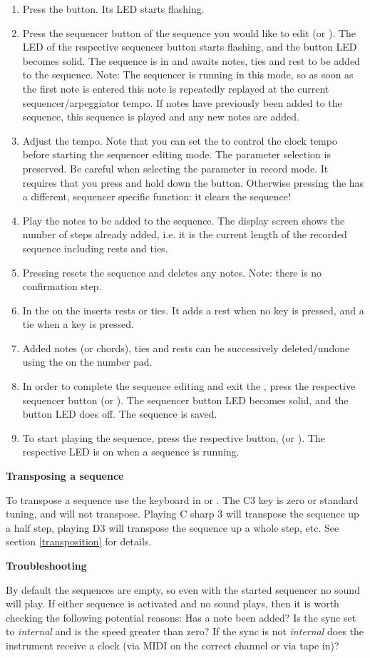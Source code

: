 \begin{enumerate}
  \item Press the \record button. Its LED starts flashing.
  \item Press the sequencer button of the sequence you would like to edit (\seqone or \seqtwo). The LED of the respective sequencer button starts flashing, and the \record button LED becomes solid. The sequence is in \seqedit and awaits notes, ties and rest to be added to the sequence. Note: The sequencer is running in this mode, so as soon as the first note is entered this note is repeatedly replayed at the current sequencer/arpeggiator tempo. If notes have previously been added to the sequence, this sequence is played and any new notes are added. 
  \item Adjust the tempo. Note that you can set the \datadial to control the clock tempo before starting the sequencer editing mode. The parameter selection is preserved. Be careful when selecting the parameter in record mode. It requires that you press and hold down the \totape button. Otherwise pressing the  has a different, sequencer specific function: it clears the sequence!  
  \item Play the notes to be added to the sequence. The display screen shows the number of steps already added, i.e. it is the current length of the recorded sequence including rests and ties.
  \item Pressing  resets the sequence and deletes any notes. Note: there is no confirmation step. 
  \item In \seqedit the  on the \termnumberpad inserts rests or ties. It adds a rest when no key is pressed, and a tie when a key is pressed.
  \item Added notes (or chords), ties and rests can be successively deleted/undone using the  on the number pad. 
  \item In order to complete the sequence editing and exit the \seqedit, press the respective sequencer button (\seqone or \seqtwo). The sequencer button LED becomes solid, and the \record button LED does off. The sequence is saved. 
  \item To start playing the sequence, press the respective button, (\seqone or \seqtwo). The respective LED is on when a sequence is running.
\end{enumerate}

\textbf{Transposing a  sequence}

To transpose a sequence use the keyboard in \shiftmode or \shiftlock. The C3 key is zero or standard tuning, and will not transpose. Playing C sharp 3 will transpose the sequence up a half step, playing D3 will transpose the sequence up a whole step, etc. See section \ref{transposition} for details.

\textbf{Troubleshooting}

By default the sequences are empty, so even with the started sequencer no sound will play. If either sequence is activated and no sound plays, then it is worth checking the following potential reasons: Has a note been added? Is the sync set to \textit{internal} and is the speed greater than zero? If the sync is not \textit{internal} does the instrument receive a clock (via MIDI on the correct channel or via tape in)?
